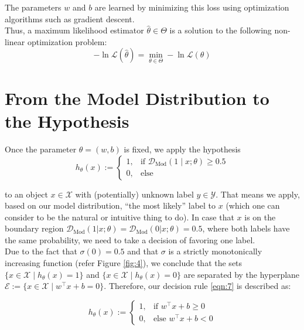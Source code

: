 The parameters $w$ and $b$ are learned by minimizing this loss using optimization algorithms such as gradient descent.\cite{murphy2012machine}\\

Thus, a maximum likelihood estimator $\hat{\theta} \in \Theta$ is a solution to the following non-linear optimization problem:
\begin{equation}
    -\ln \mathcal{L}(\hat{\theta}) = \min_{\theta \in \Theta} - \ln \mathcal{L}(\theta)
    \label{eqn:6}
\end{equation}

\section{From the Model Distribution to the Hypothesis} \label{hypothesis}

Once the parameter $\theta=(w,b)$ is fixed, we apply the hypothesis
\begin{equation}
    h_{\theta}(x) :=
    \begin{cases} 
        1, & \text{if } \mathcal{D}_{\text{Mod}}(1\mid x;\theta) \geq 0.5 \\
        0, & \text{else}
    \end{cases}
    \label{eqn:7}
\end{equation}

to an object $x \in \mathcal{X}$ with (potentially) unknown label $y \in \mathcal{Y}$. That means we apply, based on our model distribution, “the most likely” label to $x$ (which one can consider to be the natural or intuitive thing to do). In case that $x$ is on the boundary region $\mathcal{D}_{\text{Mod}}(1|x;\theta) = \mathcal{D}_{\text{Mod}}(0|x;\theta) = 0.5$, where both labels have the same probability, we need to take a decision of favoring one label.\\

Due to the fact that $\sigma(0)=0.5$ and that $\sigma$ is a strictly monotonically increasing function (refer Figure \ref{fig:4}), we conclude that the sets $\{ x \in \mathcal{X} \mid h_{\theta}(x) = 1 \}$ and $\{ x \in \mathcal{X} \mid h_{\theta}(x) = 0 \}$ are separated by the hyperplane $\mathcal{E} := \{ x \in \mathcal{X} \mid w^\top x + b = 0 \}$. Therefore, our decision rule \ref{eqn:7} is described as:

\begin{equation}
    h_{\theta}(x) :=
    \begin{cases} 
        1, & \text{if } w^\top x + b \geq 0 \\
        0, & \text{else } w^\top x + b < 0
    \end{cases}
    \label{eqn:8}
\end{equation}

